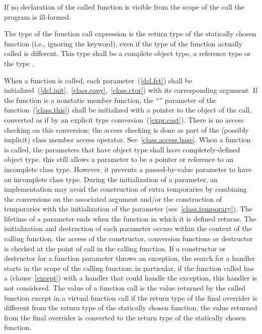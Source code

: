 \pnum
If no declaration of the called function is visible from the scope of
the call the program is ill-formed.

\pnum
The type of the function call expression is the return type of the
statically chosen function (i.e., ignoring the  keyword),
even if the type of the function actually called is different.
%
This type shall be a complete object type, a reference type or the type
.

\pnum
{}%
%
%
%
When a function is called, each parameter~(\ref{dcl.fct}) shall be
initialized~(\ref{dcl.init},~\ref{class.copy},~\ref{class.ctor}) with
its corresponding argument. If the function is a nonstatic member
function, the ``'' parameter of the function~(\ref{class.this})
shall be initialized with a pointer to the object of the call, converted
as if by an explicit type conversion~(\ref{expr.cast}).
\enternote 
There is no access checking on this conversion; the access
checking is done as part of the (possibly implicit)
class member access operator. See~\ref{class.access.base}.
\exitnote 
When a function is called, the parameters that have object type shall
have completely-defined object type.
\enternote 
this still allows a parameter to be a pointer or reference to an
incomplete class type. However, it prevents a passed-by-value parameter
to have an incomplete class type.
\exitnote 
During the initialization of a parameter, an implementation may avoid
the construction of extra temporaries by combining the conversions on
the associated argument and/or the construction of temporaries with the
initialization of the parameter (see~\ref{class.temporary}). The
lifetime of a parameter ends when the function in which it is defined
returns. The initialization and destruction of each parameter occurs
within the context of the calling function.
\enterexample 
the access of the constructor, conversion functions or destructor is
checked at the point of call in the calling function. If a constructor
or destructor for a function parameter throws an exception, the search
for a handler starts in the scope of the calling function; in
particular, if the function called has a 
(clause~\ref{except}) with a handler that could handle the exception,
this handler is not considered.
\exitexample 
The value of a function call is the value returned by the called
function except in a virtual function call if the return type of the
final overrider is different from the return type of the statically
chosen function, the value returned from the final overrider is
converted to the return type of the statically chosen function.

